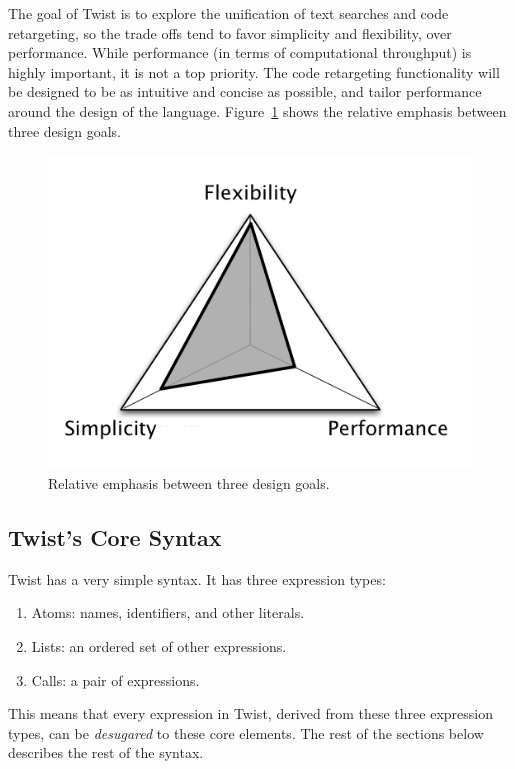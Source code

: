The goal of Twist is to explore the unification of text searches and code retargeting, so the trade offs tend to favor simplicity and flexibility, over performance. While performance (in terms of computational throughput) is highly important, it is not a top priority. The code retargeting functionality will be designed to be as intuitive and concise as possible, and tailor performance around the design of the language. Figure~\ref{fig:focalpoints} shows the relative emphasis between three design goals.

\begin{figure}[!ht]
    \centering
    \includegraphics[width=\textwidth]{images/focalpoints}
    \caption{Relative emphasis between three design goals.}
    \label{fig:focalpoints}
\end{figure}

\subsection{Twist's Core Syntax}
\label{sec:syntax}

Twist has a very simple syntax. It has three expression types: 

\begin{enumerate}
	\item Atoms: names, identifiers, and other literals.
	\item Lists: an ordered set of other expressions. 
	\item Calls: a pair of expressions.
\end{enumerate}

This means that every expression in Twist, derived from these three expression types, can be \emph{desugared} to these core elements. The rest of the sections below describes the rest of the syntax.

